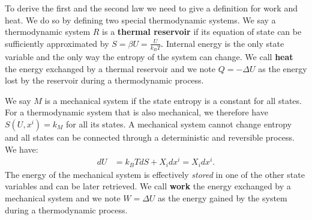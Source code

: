 \documentclass[letterpaper,twocolumn]{article}
\begin{document}
%

To derive the first and the second law we need to give a definition for work and heat. We do so by defining two special thermodynamic systems. We say a thermodynamic system $R$ is a \textbf{thermal reservoir} if its equation of state can be sufficiently approximated by $S = \beta U = \frac{U}{k_B T}$. Internal energy is the only state variable and the only way the entropy of the system can change. We call \textbf{heat} the energy exchanged by a thermal reservoir and we note $Q = - \Delta U$ as the energy lost by the reservoir during a thermodynamic process.

We say $M$ is a mechanical system if the state entropy is a constant for all states. For a thermodynamic system that is also mechanical, we therefore have  $S(U, x^i) = k_M$ for all its states. A mechanical system cannot change entropy and all states can be connected through a deterministic and reversible process. We have:
\begin{equation}
\begin{aligned}
dU &= k_B T dS + X_i dx^i = X_i dx^i.
\end{aligned}
\end{equation}
The energy of the mechanical system is effectively \emph{stored} in one of the other state variables and can be later retrieved. We call \textbf{work} the energy exchanged by a mechanical system and we note $W=\Delta U$ as the energy gained by the system during a thermodynamic process.
\end{document}
